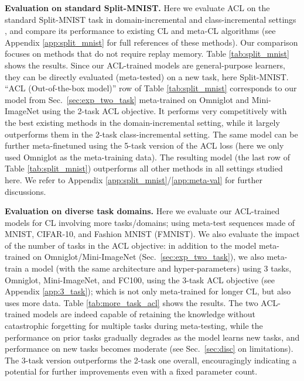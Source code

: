 \documentclass{article}
\begin{document}
\textbf{Evaluation on standard Split-MNIST.}
Here we evaluate ACL on the standard Split-MNIST task in domain-incremental and class-incremental settings \citep{hsu2018re,van2019three}, and compare its performance to existing CL and meta-CL algorithms (see Appendix \ref{app:split_mnist} for full references of these methods).
Our comparison focuses on methods that do not require replay memory.
Table \ref{tab:split_mnist} shows the results.
Since our ACL-trained models are general-purpose learners, they can be directly evaluated (meta-tested) on a new task, here Split-MNIST.
``ACL (Out-of-the-box model)'' row of Table \ref{tab:split_mnist} corresponds to our model from Sec.~\ref{sec:exp_two_task} meta-trained on Omniglot and Mini-ImageNet using the 2-task ACL objective.
It performs very competitively with the best existing methods in the domain-incremental setting, while it largely outperforms them in the 2-task class-incremental setting.
The same model can be further meta-finetuned using the 5-task version of the ACL loss (here we only used Omniglot as the meta-training data).
The resulting model (the last row of Table \ref{tab:split_mnist}) outperforms all other methods in all settings studied here.
We refer to Appendix \ref{app:split_mnist}/\ref{app:meta-val} for further discussions.

\textbf{Evaluation on diverse task domains.} Here we evaluate our ACL-trained models for CL involving more tasks/domains;
using meta-test sequences made of MNIST, CIFAR-10, and Fashion MNIST (FMNIST). We also evaluate the impact of the number of tasks in the ACL objective:
in addition to the model meta-trained on Omniglot/Mini-ImageNet (Sec.~\ref{sec:exp_two_task}), we also meta-train a model (with the same architecture and hyper-parameters) using 3 tasks, Omniglot, Mini-ImageNet, and FC100, using the 3-task ACL objective (see Appendix \ref{app:3_task}); which is not only meta-trained for longer CL, but also uses more data.
Table \ref{tab:more_task_acl} shows the results.
The two ACL-trained models are indeed capable of retaining the knowledge without catastrophic forgetting for multiple tasks during meta-testing, while the performance on prior tasks gradually degrades as the model learns new tasks, and performance on new tasks becomes moderate (see Sec.~\ref{sec:disc} on limitations).
The 3-task version outperforms the 2-task one overall, encouragingly indicating a potential for further improvements even with a fixed parameter count.
\end{document}
